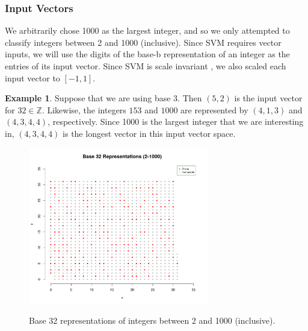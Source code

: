 \documentclass[10pt, titlepage]{amsart}
\newcommand\Z{{\mathbb Z}}
\newcommand\R{{\mathbb R}}
\theoremstyle{definition}
\newtheorem{definition}{Definition}[subsection]
\newtheorem{example}{Example}[subsection]
\begin{document}
	\subsubsection{Input Vectors}
	
	We arbitrarily chose 1000 as the largest integer, and so we only attempted to classify integers between 2 and 1000 (inclusive). 
	Since SVM requires vector inputs, we will use the digits of the base-b representation of an integer as the entries of its input vector. Since SVM is scale invariant \cite{scikit-learn}, we also scaled each input vector to $[-1,1]$.

	\begin{example}
		Suppose that we are using base 3. Then $(5,2)$ is the input vector for $32 \in \Z$. Likewise, the integers $153$ and $1000$ are represented by $(4,1,3)$ and $(4,3,4,4)$, respectively. Since 1000 is the largest integer that we are interesting in, $(4,3,4,4)$ is the longest vector in this input vector space. 
	\end{example}
	
	\begin{figure}
		\caption{Base 32 representations of integers between 2 and 1000 (inclusive).}		
		\centering
			\includegraphics[width=0.7\textwidth]{base_32}
		\label{figure:base_32}
	\end{figure}

	
	
%	
	
\end{document}
